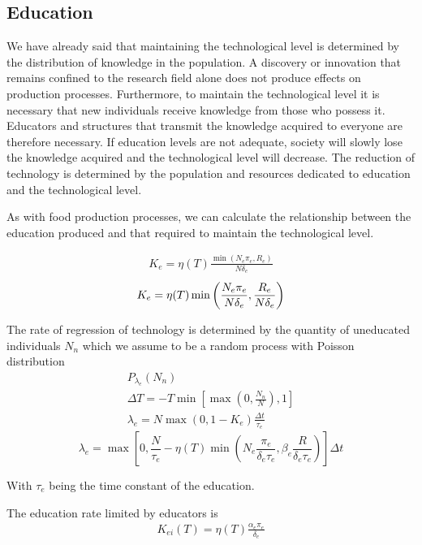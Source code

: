 \documentclass[a4paper,twoside]{article}
\begin{document}
\subsection{Education}

We have already said that maintaining the technological level is determined by the distribution of knowledge in the population.
A discovery or innovation that remains confined to the research field alone does not produce effects on production processes.
Furthermore, to maintain the technological level it is necessary that new individuals receive knowledge from those who possess it.
Educators and structures that transmit the knowledge acquired to everyone are therefore necessary.
If education levels are not adequate, society will slowly lose the knowledge acquired and the technological level will decrease.
The reduction of technology is determined by the population and resources dedicated to education and the technological level.

As with food production processes, we can calculate the relationship between the education produced and that required to maintain the technological level.

\begin{align*}
	K_e = \eta(T) \frac{\min(N_e \pi_e, R_e)}{N \delta_e}
\end{align*}
\begin{equation}{\label{eq:ke}}
	K_e = \eta(T) \min \left( \frac{N_e \pi_e}{N \delta_e}, \frac{R_e}{N \delta_e} \right)
\end{equation}

The rate of regression of technology is determined by the quantity of uneducated individuals $ N_n $ which we assume to be a random process with Poisson distribution
\begin{align*}
	P_{\lambda_e}(N_n)
	\\
	\Delta T = -T \min \left[ \max \left(0, \frac{N_n}{N} \right), 1 \right]
	\\
	\lambda_e = N \max(0, 1 - K_e) \frac{\Delta t}{\tau_e}
\end{align*}
\begin{equation}\label{eq:edu}
	\lambda_e = \max \left[ 0, \frac{N}{\tau_e} - \eta(T) \min \left( N_e \frac{\pi_e}{\delta_e \tau_e}, \beta_e \frac{R}{\delta_e \tau_e} \right) \right] \Delta t
\end{equation}

With $ \tau_e $ being the time constant of the education.

The education rate limited by educators is
\begin{align*}
	K_{ei}(T) = \eta(T) \frac{\alpha_e \pi_e}{\delta_e}
\end{align*}
\end{document}
